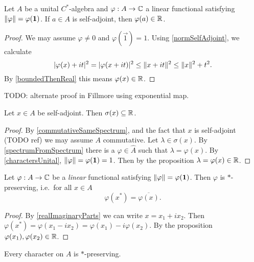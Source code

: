 \begin{proposition}
Let $A$ be a unital $C^*$-algebra and $\varphi: A\to \mathbb{C}$ a linear functional satisfying $\lVert\varphi\rVert = \varphi(\boldsymbol{\mathrm{1}})$. If $a\in A$ is self-adjoint, then $\varphi(a) \in \mathbb{R}$.
\end{proposition}
\begin{proof}
We may assume $\varphi \neq 0$ and $\varphi(\vec{1}) = 1$. Using \ref{normSelfAdjoint}, we calculate
\[ |\varphi(x)+it|^2 = |\varphi(x+it)|^2 \leq \lVert x+it\rVert^2 \leq \lVert x\rVert^2 + t^2. \]
By \ref{boundedThenReal} this means $\varphi(x)\in\mathbb{R}$.
\end{proof}
TODO: alternate proof in Fillmore using exponential map.
\begin{corollary} \label{selfAdjointSpectrumReal}
Let $x\in A$ be self-adjoint. Then $\sigma(x) \subseteq \mathbb{R}$.
\end{corollary}
\begin{proof}
By \ref{commutativeSameSpectrum}, and the fact that $x$ is self-adjoint (TODO ref) we may assume $A$ commutative. Let $\lambda \in \sigma(x)$. By \ref{spectrumFromSpectrum} there is a $\varphi\in\hat{A}$ such that $\lambda = \varphi(x)$. By \ref{charactersUnital}, $\lVert\varphi\rVert = \varphi(\boldsymbol{\mathrm{1}}) = 1$. Then by the proposition $\lambda = \varphi(x) \in \mathbb{R}$.
\end{proof}
\begin{corollary}
Let $\varphi:A\to \mathbb{C}$ be a \emph{linear} functional satisfying $\lVert\varphi\rVert = \varphi(\boldsymbol{\mathrm{1}})$. Then $\varphi$ is $*$-preserving, i.e.\ for all $x\in A$
\[\varphi(x^*) = \overline{\varphi(x)}. \] 
\end{corollary}
\begin{proof}
By \ref{realImaginaryParts} we can write $x= x_1+ix_2$. Then $\varphi(x^*) = \varphi(x_1-ix_2) = \varphi(x_1) - i \varphi(x_2)$. By the proposition $\varphi(x_1), \varphi(x_2)\in \mathbb{R}$.
\end{proof}
\begin{corollary} \label{characters*Preserving}
Every character on $A$ is $*$-preserving.
\end{corollary}

